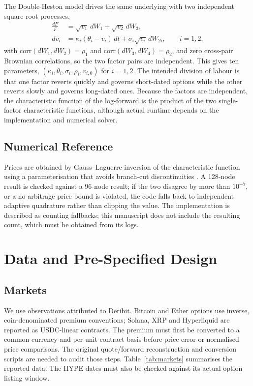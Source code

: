 \documentclass[runningheads]{llncs}
\begin{document}
The Double-Heston model drives the same underlying with two independent
square-root processes,
\begin{align}
\frac{dF}{F} &= \sqrt{v_1}\, dW_1 + \sqrt{v_2}\, dW_3, \\
dv_i &= \kappa_i(\theta_i - v_i)\, dt + \sigma_i \sqrt{v_i}\, dW_{2i},
\qquad i = 1, 2,
\end{align}
with $\mathrm{corr}(dW_1, dW_2) = \rho_1$ and
$\mathrm{corr}(dW_3, dW_4) = \rho_2$, and zero cross-pair Brownian
correlations, so the two factor pairs are independent. This gives ten
parameters, $(\kappa_i, \theta_i, \sigma_i, \rho_i, v_{i,0})$ for
$i = 1, 2$. The intended division of labour is that one factor reverts
quickly and governs short-dated options while the other reverts slowly
and governs long-dated ones. Because the factors are independent, the
characteristic function of the log-forward is the product of the two
single-factor characteristic functions, although actual runtime depends
on the implementation and numerical solver.

\subsection{Numerical Reference}
\label{sec:numerical}

Prices are obtained by Gauss--Laguerre inversion of the characteristic
function using a parameterisation that avoids branch-cut discontinuities
\cite{ref:lordkahl}. A 128-node result is checked against a 96-node
result; if the two disagree by more than $10^{-7}$, or a no-arbitrage
price bound is violated, the code falls back to independent adaptive
quadrature rather than clipping the value. The implementation is
described as counting fallbacks; this manuscript does not include the
resulting count, which must be obtained from its logs.

\section{Data and Pre-Specified Design}
\label{sec:data}

\subsection{Markets}
\label{sec:markets}

We use observations attributed to Deribit. Bitcoin and Ether options use
inverse, coin-denominated premium conventions; Solana, XRP and
Hyperliquid are reported as USDC-linear contracts. The premium must
first be converted to a common currency and per-unit contract basis
before price-error or normalised price comparisons. The original
quote/forward reconstruction and conversion scripts are needed to audit
those steps. Table~\ref{tab:markets} summarises the reported data. The
HYPE dates must also be checked against its actual option listing
window.
\end{document}
